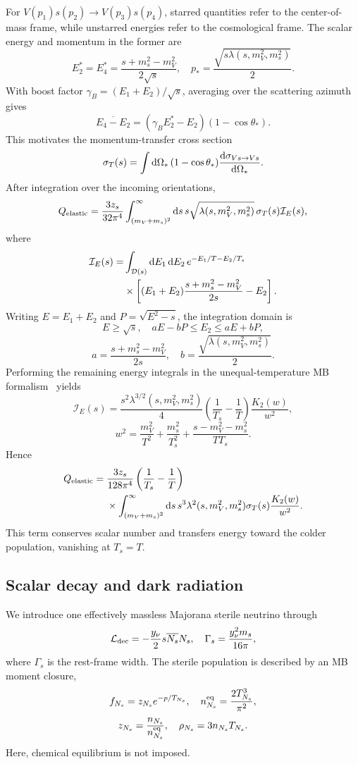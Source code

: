 \documentclass[prd,showpacs,preprintnumbers,amsmath,amssymb,twocolumn,
superscriptaddress,notitlepage]{revtex4-2}
\begin{document}
For $V(p_1)s(p_2)\to V(p_3)s(p_4)$, starred quantities
refer to the center-of-mass frame, while unstarred energies
refer to the cosmological frame. The scalar energy and
momentum in the former are
\[
E_2^*=E_4^*=\frac{s+m_s^2-m_V^2}{2\sqrt{s}},
\quad
p_*=\frac{\sqrt{s\lambda(s,m_V^2,m_s^2)}}{2}.
\]
With boost factor $\gamma_B=(E_1+E_2)/\sqrt{s}$, averaging
over the scattering azimuth gives
\[
\overline{E_4-E_2}
=(\gamma_BE_2^*-E_2)(1-\cos\theta_*).
\]
This motivates the momentum-transfer cross section
\[
\sigma_T(s)
=\int {\rm d}\Omega_*\,(1-\cos\theta_*)
\frac{{\rm d}\sigma_{Vs\to Vs}}{{\rm d}\Omega_*}.
\]
After integration over the incoming orientations,
\[
Q_{\rm elastic}
=\frac{3z_s}{32\pi^4}
\int_{(m_V+m_s)^2}^\infty {\rm d}s\,
s\sqrt{\lambda(s,m_V^2,m_s^2)}\,
\sigma_T(s)\mathcal I_E(s),
\]
where
\begin{align*}
\mathcal I_E(s)
= &\int_{\mathcal D(s)}{\rm d}E_1\,{\rm d}E_2\,
e^{-E_1/T-E_2/T_s}\\
&\times \left[(E_1+E_2)\frac{s+m_s^2-m_V^2}{2s}-E_2\right].
\end{align*}
Writing $E=E_1+E_2$ and $P=\sqrt{E^2-s}$, the integration
domain is
\[
E\ge\sqrt{s},\quad aE-bP\le E_2\le aE+bP,
\]
\[
a=\frac{s+m_s^2-m_V^2}{2s},\quad
b=\frac{\sqrt{\lambda(s,m_V^2,m_s^2)}}{2}.
\]
Performing the remaining energy integrals in the
unequal-temperature MB formalism~\cite{BeauchesneKats2021}
yields
\[
\mathcal I_E(s)
=\frac{s^2\lambda^{3/2}(s,m_V^2,m_s^2)}{4}
\left(\frac1{T_s}-\frac1T\right)\frac{K_2(w)}{w^2},
\]
\[
w^2=\frac{m_V^2}{T^2}+\frac{m_s^2}{T_s^2}
+\frac{s-m_V^2-m_s^2}{TT_s}.
\]
Hence
\begin{align}
Q_{\rm elastic}
={}&\frac{3z_s}{128\pi^4}
\left(\frac1{T_s}-\frac1T\right)
\nonumber\\
&\times\int_{(m_V+m_s)^2}^\infty {\rm d}s\,
s^3\lambda^2(s,m_V^2,m_s^2)
\sigma_T(s)\frac{K_2(w)}{w^2}.
\end{align}
This term conserves scalar number and transfers energy
toward the colder population, vanishing at $T_s=T$.

\subsection{Scalar decay and dark radiation}

We introduce one effectively massless Majorana sterile
neutrino through
\[
\mathcal L_{\rm dec}
=-\frac{y_\nu}{2}s\overline{N_s}N_s,
\quad
\Gamma_s=\frac{y_\nu^2m_s}{16\pi},
\]
where $\Gamma_s$ is the rest-frame width. The sterile
population is described by an MB moment closure,
\[
f_{N_s}=z_{N_s}e^{-p/T_{N_s}},
\quad
n_{N_s}^{\rm eq}=\frac{2T_{N_s}^3}{\pi^2},
\]
\[
z_{N_s}=\frac{n_{N_s}}{n_{N_s}^{\rm eq}},
\quad
\rho_{N_s}=3n_{N_s}T_{N_s}.
\]
Here, chemical equilibrium is not imposed.
\end{document}
